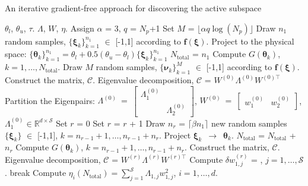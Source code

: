 \bigskip
\begin{breakablealgorithm}
\renewcommand{\algorithmicrequire}{\textbf{Input:}}
\renewcommand{\algorithmicensure}{\textbf{Output:}}
  \caption{An iterative gradient-free approach for discovering the active subspace}
  \begin{algorithmic}[1]
\Require $\theta_l$, $\theta_u$, $\tau$. 
\Ensure $\Lambda$, $W$, $\eta$. 
	\State Assign $\alpha$ = 3, $q$ = $N_p$+1
	\State Set $M$ = $\lfloor\alpha q\log(N_p)\rfloor$
	\State Draw $n_1$ random samples, $\{\bm{\xi}_k\}_{k=1}^{n_1}$ $\in$ [-1,1]
         according to $\bm{f(\xi)}$.
	\State Project to the physical space:
        $\{\bm{\theta}_k\}_{k=1}^{n_1}=\theta_l+0.5(\theta_u-\theta_l)\{\bm{\xi}_k\}_{k=1}^{n_1}$
	\State $N_\text{total}$ = $n_1$ 
	\State Compute $G(\bm\theta_k)$, $k=1, \ldots, N_\text{total}$.
	\State Draw $M$ random samples, $\{\bm{\nu}_k\}_{k=1}^{M}$ $\in$ [-1,1]
         according to $\bm{f(\xi)}$.
	\State Construct the matrix, $\mathcal{C}$.
	\State Eigenvalue decomposition, $\mathcal{C}$ = $W^{(0)}\Lambda^{(0)} W^{(0)\top}$
	\State Partition the Eigenpairs: $\Lambda^{(0)}~=~ 
        \begin{bmatrix} \Lambda_1^{(0)} & \\ & \Lambda_2^{(0)} \end{bmatrix}$, 
        $W^{(0)}~=~\begin{bmatrix} w_1^{(0)} & w_2^{(0)} \end{bmatrix}$, 
        $\Lambda_1^{(0)}\in \mathbb{R}^{d\times\mathcal{S}}$
	\State Set $r$ = 0
	\Loop
		\State Set $r$ = $r$ + 1
		\State Draw $n_r$ = $\lceil \beta n_1 \rceil$ new random samples 
                $\{\bm{\xi}_k\}$ $\in$ [-1,1], $k = n_{r-1}+1,\ldots,n_{r-1}+n_r$.
		\State Project $\bm{\xi}_k$~$\rightarrow$~$\bm{\theta}_k$.
		\State $N_\text{total}$ = $N_\text{total}$ + $n_r$ 
		\State Compute $G(\bm\theta_k)$, $k=n_{r-1}+1, \ldots, n_{r-1}+n_r$.  
		\State Construct the matrix, $\mathcal{C}$.
		\State Eigenvalue decomposition, $\mathcal{C}$ = $W^{(r)}\Lambda^{(r)} W^{(r)\top}$
		\State Compute $\delta w_{1,j}^{(r)}$ = 
                       , 
                       $j = 1,\ldots,\mathcal{S}$.
			\State break
		\EndIf
	\EndLoop
	\State Compute $\eta_i(N_\text{total}) = \sum\limits_{j=1}^{\mathcal{S}} \Lambda_{1,j}w_{1,j}^2$,
	$i=1,\ldots,d$.
    \EndProcedure
  \end{algorithmic}
  \label{alg:free}
\end{breakablealgorithm}
\bigskip

